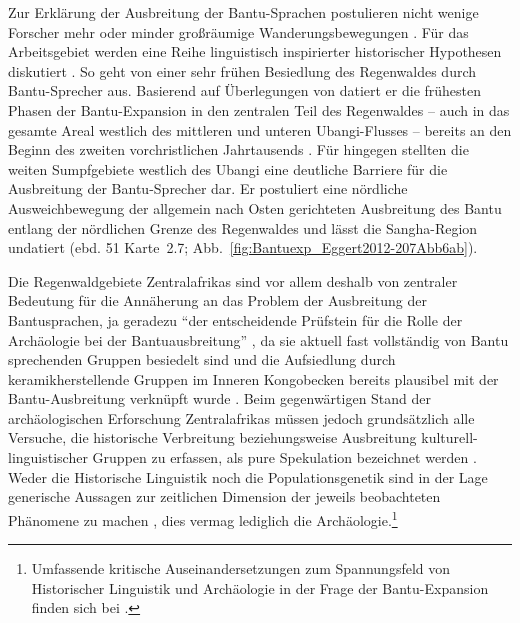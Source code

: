 Zur Erklärung der Ausbreitung der Bantu-Sprachen postulieren nicht wenige Forscher mehr oder minder großräumige Wanderungsbewegungen \parencites{Vansina.1995}{Ehret.2001}. Für das Arbeitsgebiet werden eine Reihe linguistisch inspirierter historischer Hypothesen diskutiert \parencite[10f.; siehe Abb.~\ref{fig:Bantuexp_Eggert2012-207Abb6ab}--\ref{fig:Bantuexp_deMaret2013-630Fig43-2}]{Eggert.1992}. So geht \textcite{Ehret.1982} von einer sehr frühen Besiedlung des Regenwaldes durch Bantu-Sprecher aus. Basierend auf Überlegungen von \textcite{Heine.1973} datiert er die frühesten Phasen der Bantu-Expansion in den zentralen Teil des Regenwaldes -- auch in das gesamte Areal westlich des mittleren und unteren Ubangi-Flusses -- bereits an den Beginn des zweiten vorchristlichen Jahrtausends \parencite[58, 63~Karte 10; Abb.~\ref{fig:Bantuexp_deMaret2013-630Fig43-2}]{Ehret.1982}. Für \textcite[51f. Karten~2.7--2.8]{Vansina.1990} hingegen stellten die weiten Sumpfgebiete westlich des Ubangi eine deutliche Barriere für die Ausbreitung der Bantu-Sprecher dar. Er postuliert eine nördliche Ausweichbewegung der allgemein nach Osten gerichteten Ausbreitung des Bantu entlang der nördlichen Grenze des Regenwaldes und lässt die Sangha-Region undatiert (ebd. 51 Karte~2.7; Abb.~\ref{fig:Bantuexp_Eggert2012-207Abb6ab}).

Die Regenwaldgebiete Zentralafrikas sind vor allem deshalb von zentraler Bedeutung für die Annäherung an das Problem der Ausbreitung der Bantusprachen, ja geradezu \enquote{der entscheidende Prüfstein für die Rolle der Archäologie bei der Bantuausbreitung} \parencite[207]{Eggert.2012}, da sie aktuell fast vollständig von Bantu sprechenden Gruppen besiedelt sind und die Aufsiedlung durch keramikherstellende Gruppen im Inneren Kongobecken bereits plausibel mit der Bantu-Ausbreitung verknüpft wurde \parencite[244--246]{Wotzka.1995}. Beim gegenwärtigen Stand der archäologischen Erforschung Zentralafrikas müssen jedoch grundsätzlich alle Versuche, die historische Verbreitung beziehungsweise Ausbreitung kulturell-linguistischer Gruppen zu erfassen, als pure Spekulation bezeichnet werden \parencites[78]{David.1982}[105]{Boyd.2007}. Weder die Historische Linguistik noch die Populationsgenetik sind in der Lage generische Aussagen zur zeitlichen Dimension der jeweils beobachteten Phänomene zu machen \parencite[84]{Eggert.2016c}, dies vermag lediglich die Archäologie.\footnote{Umfassende kritische Auseinandersetzungen zum Spannungsfeld von Historischer Linguistik und Archäologie in der Frage der Bantu-Expansion finden sich bei \textcites{Eggert.2005}{Eggert.2012c}{Eggert.2012}{Eggert.2016c}.}

